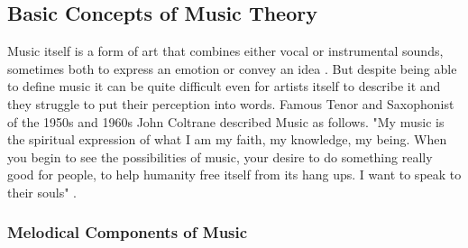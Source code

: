 \subsection{Basic Concepts of Music Theory}



Music itself is a form of art that combines either vocal or instrumental sounds,
sometimes both to express an emotion or convey an idea \cite{Becker2021WhatIsMusic}.
But despite being able to define music it can be quite difficult even for artists itself to describe
it and they struggle to put their perception into words. Famous Tenor and Saxophonist of
the 1950s and 1960s John Coltrane described Music as follows.
"My music is the spiritual expression of what I am my faith, my knowledge, my being.
When you begin to see the possibilities of music, your desire to do something really good for people,
to help humanity free itself from its hang ups. I want to speak to their souls" \cite{Havers2021Sax}.

\subsubsection{Melodical Components of Music}

